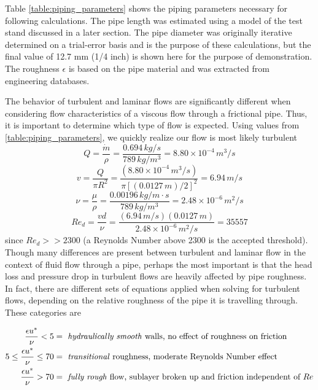 \documentclass[9pt]{article} %
\numberwithin{equation}{section} %
\begin{document}
Table \ref{table:piping_parameters} shows the piping parameters necessary for following calculations. The pipe length was estimated using a model of the test stand discussed in a later section. The pipe diameter was originally iterative determined on a trial-error basis and is the purpose of these calculations, but the final value of 12.7 mm (1/4 inch) is shown here for the purpose of demonstration. The roughness $\epsilon$ is based on the pipe material and was extracted from engineering databases.

The behavior of turbulent and laminar flows are significantly different when considering flow characteristics of a viscous flow through a frictional pipe. Thus, it is important to determine which type of flow is expected. Using values from \ref{table:piping_parameters}, we quickly realize our flow is most likely turbulent
\begin{equation}
Q = \frac{\dot{m}}{\rho} = \frac{0.694\, kg/s}{789\, kg/m^{3}} = 8.80 \times 10^{-4}\, m^{3}/s
\end{equation}
\begin{equation}
v = \frac{Q}{\pi R^{2}} = \frac{(8.80 \times 10^{-4}\, m^{3}/s)}{\pi [(0.0127\, m) / 2]^{2}} = 6.94\, m/s
\end{equation}
\begin{equation}
\nu = \frac{\mu}{\rho} = \frac{0.00196\, kg/m \cdot s}{789\, kg/m^{3}} = 2.48 \times 10^{-6}\, m^{2}/s
\end{equation}
\begin{equation}
Re_{d} = \frac{v d}{\nu} = \frac{(6.94\, m/s)(0.0127\, m)}{2.48 \times 10^{-6}\, m^{2}/s} = 35557
\end{equation}
since $Re_{d} >> 2300$ (a Reynolds Number above 2300 is the accepted threshold). Though many differences are present between turbulent and laminar flow in the context of fluid flow through a pipe, perhaps the most important is that the head loss and pressure drop in turbulent flows are heavily affected by pipe roughness. In fact, there are different sets of equations applied when solving for turbulent flows, depending on the relative roughness of the pipe it is travelling through. These categories are \cite{fluid-mechanics}

\begin{align*}
\frac{\epsilon u^{*}}{\nu} < 5 &= \text{ \textit{hydraulically smooth} walls, no effect of roughness on friction} \\
5 \leq \frac{\epsilon u^{*}}{\nu} \leq 70 &= \text{ \textit{transitional} roughness, moderate Reynolds Number effect} \\
\frac{\epsilon u^{*}}{\nu} > 70 &= \text{ \textit{fully rough} flow, sublayer broken up and friction independent of } Re
\end{align*}
\end{document}
